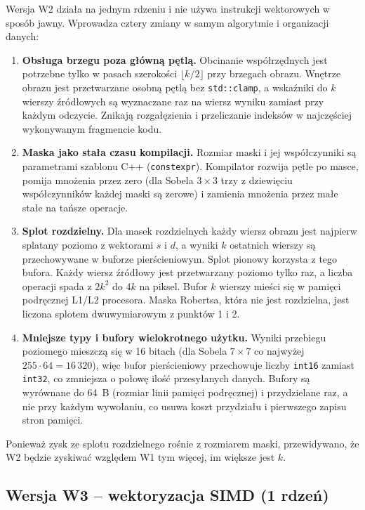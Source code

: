 \documentclass[12pt,a4paper]{article}
\newcommand{\kod}[1]{\texttt{#1}}
\begin{document}
Wersja W2 działa na jednym rdzeniu i nie używa instrukcji wektorowych w sposób jawny. Wprowadza cztery zmiany w samym algorytmie i organizacji danych:
\begin{enumerate}
	\item \textbf{Obsługa brzegu poza główną pętlą.} Obcinanie współrzędnych jest potrzebne tylko w pasach szerokości $\lfloor k/2 \rfloor$ przy brzegach obrazu. Wnętrze obrazu jest przetwarzane osobną pętlą bez \kod{std::clamp}, a wskaźniki do $k$ wierszy źródłowych są wyznaczane raz na wiersz wyniku zamiast przy każdym odczycie. Znikają rozgałęzienia i przeliczanie indeksów w najczęściej wykonywanym fragmencie kodu.
	\item \textbf{Maska jako stała czasu kompilacji.} Rozmiar maski i jej współczynniki są parametrami szablonu C++ (\kod{constexpr}). Kompilator rozwija pętle po masce, pomija mnożenia przez zero (dla Sobela $3\times3$ trzy z dziewięciu współczynników każdej maski są zerowe) i zamienia mnożenia przez małe stałe na tańsze operacje.
	\item \textbf{Splot rozdzielny.} Dla masek rozdzielnych każdy wiersz obrazu jest najpierw splatany poziomo z wektorami $s$ i $d$, a wyniki $k$ ostatnich wierszy są przechowywane w buforze pierścieniowym. Splot pionowy korzysta z tego bufora. Każdy wiersz źródłowy jest przetwarzany poziomo tylko raz, a liczba operacji spada z $2k^2$ do $4k$ na piksel. Bufor $k$ wierszy mieści się w pamięci podręcznej L1/L2 procesora. Maska Robertsa, która nie jest rozdzielna, jest liczona splotem dwuwymiarowym z punktów 1 i 2.
	\item \textbf{Mniejsze typy i bufory wielokrotnego użytku.} Wyniki przebiegu poziomego mieszczą się w 16 bitach (dla Sobela $7\times7$ co najwyżej $255 \cdot 64 = 16\,320$), więc bufor pierścieniowy przechowuje liczby \kod{int16} zamiast \kod{int32}, co zmniejsza o połowę ilość przesyłanych danych. Bufory są wyrównane do 64~B (rozmiar linii pamięci podręcznej) i przydzielane raz, a nie przy każdym wywołaniu, co usuwa koszt przydziału i pierwszego zapisu stron pamięci.
\end{enumerate}
Ponieważ zysk ze splotu rozdzielnego rośnie z rozmiarem maski, przewidywano, że W2 będzie zyskiwać względem W1 tym więcej, im większe jest $k$.

\subsection{Wersja W3 -- wektoryzacja SIMD (1 rdzeń)}
\label{sec:w3opis}
\end{document}
